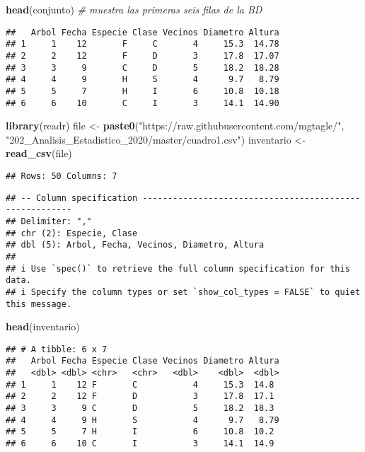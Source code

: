 \documentclass[
]{article}
\newenvironment{Shaded}{\begin{snugshade}}{\end{snugshade}}
\newcommand{\CommentTok}[1]{\textcolor[rgb]{0.56,0.35,0.01}{\textit{#1}}}
\newcommand{\FunctionTok}[1]{\textcolor[rgb]{0.13,0.29,0.53}{\textbf{#1}}}
\newcommand{\NormalTok}[1]{#1}
\newcommand{\OtherTok}[1]{\textcolor[rgb]{0.56,0.35,0.01}{#1}}
\newcommand{\StringTok}[1]{\textcolor[rgb]{0.31,0.60,0.02}{#1}}
\begin{document}
\begin{Shaded}
\begin{Highlighting}[]
\FunctionTok{head}\NormalTok{(conjunto) }\CommentTok{\# muestra las primeras seis filas de la BD}
\end{Highlighting}
\end{Shaded}

\begin{verbatim}
##   Arbol Fecha Especie Clase Vecinos Diametro Altura
## 1     1    12       F     C       4     15.3  14.78
## 2     2    12       F     D       3     17.8  17.07
## 3     3     9       C     D       5     18.2  18.28
## 4     4     9       H     S       4      9.7   8.79
## 5     5     7       H     I       6     10.8  10.18
## 6     6    10       C     I       3     14.1  14.90
\end{verbatim}

\begin{Shaded}
\begin{Highlighting}[]
\FunctionTok{library}\NormalTok{(readr)}
\NormalTok{file }\OtherTok{\textless{}{-}} \FunctionTok{paste0}\NormalTok{(}\StringTok{"https://raw.githubusercontent.com/mgtagle/"}\NormalTok{,}
               \StringTok{"202\_Analisis\_Estadistico\_2020/master/cuadro1.csv"}\NormalTok{)}
\NormalTok{inventario }\OtherTok{\textless{}{-}} \FunctionTok{read\_csv}\NormalTok{(file)}
\end{Highlighting}
\end{Shaded}

\begin{verbatim}
## Rows: 50 Columns: 7
\end{verbatim}

\begin{verbatim}
## -- Column specification --------------------------------------------------------
## Delimiter: ","
## chr (2): Especie, Clase
## dbl (5): Arbol, Fecha, Vecinos, Diametro, Altura
## 
## i Use `spec()` to retrieve the full column specification for this data.
## i Specify the column types or set `show_col_types = FALSE` to quiet this message.
\end{verbatim}

\begin{Shaded}
\begin{Highlighting}[]
\FunctionTok{head}\NormalTok{(inventario)}
\end{Highlighting}
\end{Shaded}

\begin{verbatim}
## # A tibble: 6 x 7
##   Arbol Fecha Especie Clase Vecinos Diametro Altura
##   <dbl> <dbl> <chr>   <chr>   <dbl>    <dbl>  <dbl>
## 1     1    12 F       C           4     15.3  14.8 
## 2     2    12 F       D           3     17.8  17.1 
## 3     3     9 C       D           5     18.2  18.3 
## 4     4     9 H       S           4      9.7   8.79
## 5     5     7 H       I           6     10.8  10.2 
## 6     6    10 C       I           3     14.1  14.9
\end{verbatim}
\end{document}
